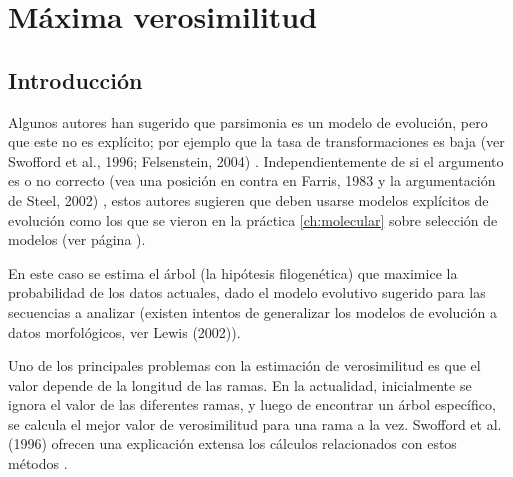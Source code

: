 \chapter{M\'axima verosimilitud}
\section*{Introducci\'on}
\label{ch:likelihood}

Algunos autores han sugerido que parsimonia es un modelo de evoluci\'on, pero que este no es expl\'icito; por ejemplo que la tasa de transformaciones es baja (ver Swofford et al., 1996; Felsenstein, 2004)\cite{Swofford1996} \cite{Felsenstein2004}. Independientemente de si el argumento es o no correcto (vea una posici\'on en contra en Farris, 1983 y la argumentaci\'on de Steel, 2002) \cite{Farris1983} \cite{Steel2002}, estos autores sugieren que deben usarse modelos expl\'icitos de evoluci\'on como los que se vieron en la pr\'actica \ref{ch:molecular} sobre selecci\'on de modelos (ver p\'agina \pageref{ch:molecular}).

En este caso se estima el \'arbol (la hip\'otesis filogen\'etica) que maximice la probabilidad de los datos actuales, dado el modelo evolutivo sugerido para las secuencias a analizar (existen intentos de generalizar los modelos de evoluci\'on a datos morfol\'ogicos, ver  Lewis (2002)\cite{Lewis2001}).

Uno de los principales problemas con la estimaci\'on de verosimilitud es que el valor depende de la longitud de las ramas. En la actualidad, inicialmente se ignora el valor de las diferentes ramas, y luego de encontrar un \'arbol espec\'ifico, se calcula el mejor valor de verosimilitud para una rama a la vez. Swofford et al. (1996) ofrecen una explicaci\'on extensa los c\'alculos relacionados con estos m\'etodos \cite{Swofford1996}.




